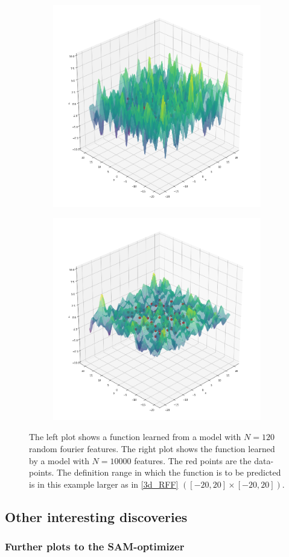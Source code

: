 \begin{figure}[!htp]
\centering
\begin{subfigure}{}
  \centering
  \includegraphics[width=.49\linewidth]{Abschlussarbeit_2021/LaTeX/images/extrapol_less.png}
  \label{fig:sub1}
\end{subfigure}%
\begin{subfigure}{}
  \centering
  \includegraphics[width=.49\linewidth]{Abschlussarbeit_2021/LaTeX/images/extrapol_many.png}
  \label{fig:sub2}
\label{fig:high_varianz_with_noise}  
\end{subfigure}
\caption{The left plot shows a function learned from a model with $N = 120$ random fourier features. The right plot shows the function learned by a model with $N = 10000$ features. The red points are the data-points. The definition range in which the function is to be predicted is in this example larger as in \ref{3d_RFF} $([-20,20] \times [-20,20])$.}
\label{3d_RFF_extra}
\end{figure}

\subsection{Other interesting discoveries }

\subsubsection{Further plots to the SAM-optimizer }
\label{sam_extension}


